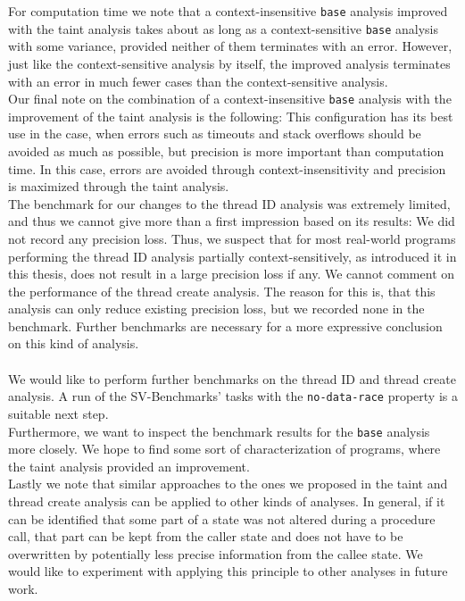   For computation time we note that a context-insensitive \texttt{base} analysis improved with the taint analysis takes about as long as a context-sensitive \texttt{base} analysis with some variance, provided neither of them terminates with an error. However, just like the context-sensitive analysis by itself, the improved analysis terminates with an error in much fewer cases than the context-sensitive analysis.\\
  Our final note on the combination of a context-insensitive \texttt{base} analysis with the improvement of the taint analysis is the following: This configuration has its best use in the case, when errors such as timeouts and stack overflows should be avoided as much as possible, but precision is more important than computation time. In this case, errors are avoided through context-insensitivity and precision is maximized through the taint analysis.\\
  The benchmark for our changes to the thread ID analysis was extremely limited, and thus we cannot give more than a first impression based on its results: We did not record any precision loss. Thus, we suspect that for most real-world programs performing the thread ID analysis partially context-sensitively, as introduced it in this thesis, does not result in a large precision loss if any. We cannot comment on the performance of the thread create analysis. The reason for this is, that this analysis can only reduce existing precision loss, but we recorded none in the benchmark. Further benchmarks are necessary for a more expressive conclusion on this kind of analysis.\\
  \\
  We would like to perform further benchmarks on the thread ID and thread create analysis. A run of the SV-Benchmarks' tasks with the \texttt{no-data-race} property is a suitable next step.\\
  Furthermore, we want to inspect the benchmark results for the \texttt{base} analysis more closely. We hope to find some sort of characterization of programs, where the taint analysis provided an improvement.\\
  Lastly we note that similar approaches to the ones we proposed in the taint and thread create analysis can be applied to other kinds of analyses. In general, if it can be identified that some part of a state was not altered during a procedure call, that part can be kept from the caller state and does not have to be overwritten by potentially less precise information from the callee state. We would like to experiment with applying this principle to other analyses in future work.\\

